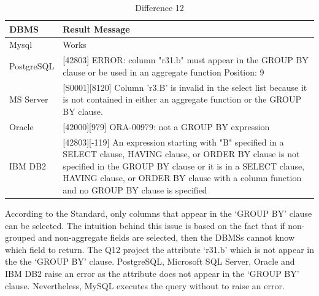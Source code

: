 \begin{table}[h]
\centering
\caption{Difference 12}
\label{my-label}
\begin{tabular}{|p{2cm}|p{11.5cm}| }
\hline
\textbf{DBMS} & \textbf{Result Message}                                                                                                                                                                                                                                                                 \\ \hline
Mysql         & Works                                                                                                                                                                                                                                                                                   \\ \hline
PostgreSQL    & {[}42803{]} ERROR: column "r31.b" must appear in the GROUP BY clause or be used in an aggregate function Position: 9                                                                                                                                                                    \\ \hline
MS Server     & {[}S0001{]}{[}8120{]} Column 'r3.B' is invalid in the select list because it is not contained in either an aggregate function or the GROUP BY clause.                                                                                                                                   \\ \hline
Oracle        & {[}42000{]}{[}979{]} ORA-00979: not a GROUP BY expression                                                                                                                                                                                                                               \\ \hline
IBM DB2       & {[}42803{]}{[}-119{]} An expression starting with "B" specified in a SELECT clause, HAVING clause, or ORDER BY clause is not specified in the GROUP BY clause or it is in a SELECT clause, HAVING clause, or ORDER BY clause with a column function and no GROUP BY clause is specified \\ \hline
\end{tabular}
\end{table}

According to the Standard, only columns that appear in the ‘GROUP BY’ clause can be selected. The intuition behind this issue is based on the fact that if non-grouped and non-aggregate fields are selected, then the DBMSs cannot know which field to return. The Q12 project the attribute  ‘r31.b’ which is not appear in the the ‘GROUP BY’ clause. PostgreSQL, Microsoft SQL Server, Oracle and IBM DB2 raise an error as the attribute does not appear in the ‘GROUP BY’ clause. Nevertheless, MySQL executes the query without to raise an error. 



